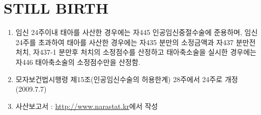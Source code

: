\section{STILL BIRTH}
{\begin{enumerate}\tightlist
\item 임신 24주이내 태아를 사산한 경우에는 자445 인공임신중절수술에 준용하며, 임신 24주를 초과하여 태아를 사산한 경우에는 자435 분만의 소정금액과 자437 분만전처치, 자437-1 분만후 처치의 소정점수를 산정하고 태아축소술을 실시한 경우에는 자446 태아축소술의 소정점수만을 산정함.
\item 모자보건법시행령 제15조(인공임신수술의 허용한계) 28주에서 24주로 개정(2009.7.7)
\item 사산보고서 : \url{http://www.narastat.kr}에서 작성
\end{enumerate}
}
\prezi{\clearpage}

